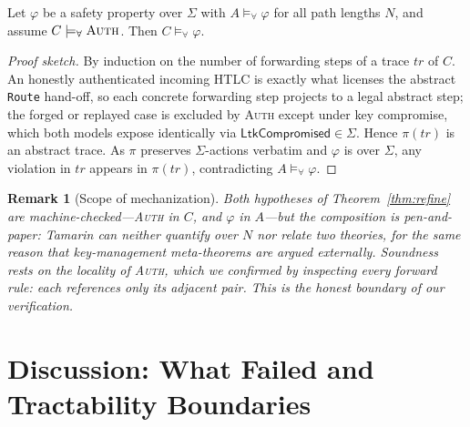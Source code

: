 \documentclass[sigconf,review]{acmart}
\theoremstyle{acmdefinition}
\newtheorem{remark}{Remark}
\begin{document}
\begin{theorem}
\label{thm:refine}
Let $\varphi$ be a safety property over $\Sigma$ with $A \models_{\forall} \varphi$ for all path lengths $N$, and assume $C \models_{\forall} \textsc{Auth}$. Then $C \models_{\forall} \varphi$.
\end{theorem}

\begin{proof}[Proof sketch]
By induction on the number of forwarding steps of a trace $\mathit{tr}$ of $C$. An honestly authenticated incoming HTLC is exactly what licenses the abstract \texttt{Route} hand-off, so each concrete forwarding step projects to a legal abstract step; the forged or replayed case is excluded by \textsc{Auth} except under key compromise, which both models expose identically via $\mathsf{LtkCompromised} \in \Sigma$. Hence $\pi(\mathit{tr})$ is an abstract trace. As $\pi$ preserves $\Sigma$-actions verbatim and $\varphi$ is over $\Sigma$, any violation in $\mathit{tr}$ appears in $\pi(\mathit{tr})$, contradicting $A \models_{\forall} \varphi$.
\end{proof}

\begin{remark}[Scope of mechanization]
\label{rem:scope}
Both hypotheses of Theorem~\ref{thm:refine} are machine-checked---\textsc{Auth} in $C$, and $\varphi$ in $A$---but the composition is pen-and-paper: Tamarin can neither quantify over $N$ nor relate two theories, for the same reason that key-management meta-theorems are argued externally. Soundness rests on the locality of \textsc{Auth}, which we confirmed by inspecting every forward rule: each references only its adjacent pair. This is the honest boundary of our verification.
\end{remark}

\section{Discussion: What Failed and Tractability Boundaries}
\end{document}
